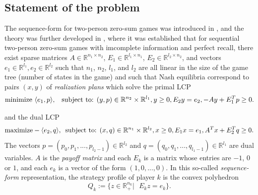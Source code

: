 \documentclass{article} %
\begin{document}
\subsection{Statement of the problem}
The sequence-form for two-person zero-sum games was introduced in
\cite{koller1992complexity}, and the theory was further developed in
\cite{koller1994fast,von1996efficient,vonequilibrium}, where it was
established that for sequential two-person zero-sum games with
imcomplete information and perfect recall, there exist sparse matrices
$A \in \mathbb{R}^{n_1 \times n_2}$, $E_1 \in \mathbb{R}^{l_1 \times
  n_1}$, $E_2 \in \mathbb{R}^{l_2 \times n_2}$, and vectors $e_1 \in
\mathbb{R}^{l_1}, e_2 \in \mathbb{R}^{l_2}$ such that $n_1$, $n_2$,
$l_1$, and $l_2$ are all linear in the size of the game tree (number
of states in the game) and such that Nash equilibria correspond to
pairs $(x, y)$ of \textit{realization plans} which solve the primal
LCP
\begin{equation}
  \begin{aligned}
     \text{minimize }\langle e_1, p\rangle, \hspace{.5em}\text{
       subject to: }(y,p) \in \mathbb{R}^{n_2} \times
     \mathbb{R}^{l_1},  y \ge 0, E_2y = e_2, -Ay + E_1^Tp \geq 0.
  \end{aligned}
  \label{eq:primal_pb}
\end{equation}

and the dual LCP
\begin{equation}
  \begin{aligned}
    \text{maximize}-\langle e_2, q\rangle,\hspace{.5em}\text{subject
      to: }(x,q) \in \mathbb{R}^{n_1} \times \mathbb{R}^{l_2},  x \ge
    0, E_1x = e_1, A^Tx + E_2^Tq \geq 0.
  \end{aligned}
  \label{eq:dual_pb}
\end{equation}
The vectors $p = (p_0, p_1, ..., p_{l_2 - 1}) \in \mathbb{R}^{l_2}$
and $q = (q_0, q_1, ..., q_{l_1 - 1}) \in \mathbb{R}^{l_1}$ are dual
variables. 
$A$ is the \textit{payoff matrix} and each $E_k$ is a matrix whose
entries are $-1$, $0$ or $1$, and each $e_k$ is a vector of the form
$(1, 0, ..., 0)$. In this so-called \textit{sequence-form}
representation, the strategy profile of player $k$ is the convex polyhedron
\begin{equation}
  Q_k := \{z \in \mathbb{R}^{n_k}_+ |\text{ }E_kz = e_k\}.
\label{eq:polyhedron}
\end{equation}
\end{document}
